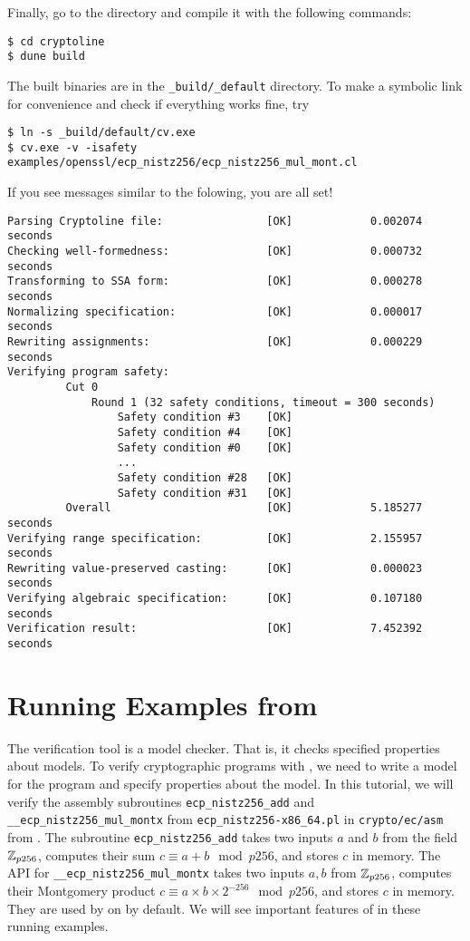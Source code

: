 \documentclass{amsproc}
\begin{document}
Finally, go to the \cryptoline directory and compile it with the
following commands:
\begin{verbatim}
$ cd cryptoline
$ dune build
\end{verbatim}

The built \cryptoline binaries are in the \texttt{\_build/\_default}
directory. To make a symbolic link for convenience and check if
everything works fine, try
\begin{verbatim}
$ ln -s _build/default/cv.exe
$ cv.exe -v -isafety examples/openssl/ecp_nistz256/ecp_nistz256_mul_mont.cl
\end{verbatim}

If you see messages similar to the folowing, you are all set!
\begin{verbatim}
Parsing Cryptoline file:                [OK]            0.002074 seconds
Checking well-formedness:               [OK]            0.000732 seconds
Transforming to SSA form:               [OK]            0.000278 seconds
Normalizing specification:              [OK]            0.000017 seconds
Rewriting assignments:                  [OK]            0.000229 seconds
Verifying program safety:
         Cut 0
             Round 1 (32 safety conditions, timeout = 300 seconds)
                 Safety condition #3    [OK]
                 Safety condition #4    [OK]
                 Safety condition #0    [OK]
                 ...
                 Safety condition #28   [OK]
                 Safety condition #31   [OK]
         Overall                        [OK]            5.185277 seconds
Verifying range specification:          [OK]            2.155957 seconds
Rewriting value-preserved casting:      [OK]            0.000023 seconds
Verifying algebraic specification:      [OK]            0.107180 seconds
Verification result:                    [OK]            7.452392 seconds 
\end{verbatim}

\section{Running Examples from \openssl}

The \cryptoline verification tool is a model checker. That is, it
checks specified properties about models. To verify cryptographic
programs with \cryptoline, we need to write a model for the program
and specify properties about the model. In this tutorial, we will
verify the \xeightysix assembly subroutines \texttt{ecp\_nistz256\_add}
and \texttt{\_\_ecp\_nistz256\_mul\_montx} from
\texttt{ecp\_nistz256-x86\_64.pl} in \texttt{crypto/ec/asm} from
\openssl. The subroutine \texttt{ecp\_nistz256\_add} takes two inputs
$a$ and $b$ from the field $\mathbb{Z}_{p256}$, computes their sum $c \equiv
a + b \mod p256$, and stores $c$ in memory. The API for
\texttt{\_\_ecp\_nistz256\_mul\_montx} takes two inputs $a, b$ from
$\mathbb{Z}_{p256}$, computes their Montgomery product $c \equiv a \times b
\times 2^{-256} \mod p256$, and stores $c$ in memory. They are used by
\openssl on \xeightysix by default. We will see important features of
\cryptoline in these running examples.
\end{document}
